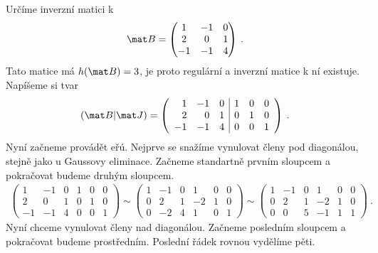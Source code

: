 \begin{example}
    Určíme inverzní matici k \begin{align}
        \mat B = \begin{pmatrix}
            1 & -1 & 0 \\
            2 & 0 & 1 \\
            -1 & -1 & 4
        \end{pmatrix} \:.
    \end{align}
    Tato matice má $h(\mat B ) = 3$, je proto regulární a inverzní matice k ní existuje.
    Napíšeme si tvar \begin{align}
        (\mat B | \mat J) = \left(\begin{array}{rrr|rrr}
            1 & -1 & 0 & 1 & 0 & 0\\
            2 & 0 & 1 & 0 & 1 & 0\\
            -1 & -1 & 4 & 0 & 0 & 1
        \end{array}\right) \:.
    \end{align}
    Nyní začneme provádět eřú. Nejprve se snažíme vynulovat členy pod diagonálou, stejně jako u Gaussovy eliminace. Začneme standartně prvním sloupcem a pokračovat budeme druhým sloupcem.
    \begin{align}
        \left(\begin{array}{rrr|rrr}
            1 & -1 & 0 & 1 & 0 & 0\\
            2 & 0 & 1 & 0 & 1 & 0\\
            -1 & -1 & 4 & 0 & 0 & 1
        \end{array}\right) 
        \sim
        \left(\begin{array}{rrr|rrr}
            1 & -1 & 0 & 1 & 0 & 0\\
            0 & 2 & 1 & -2 & 1 & 0\\
            0 & -2 & 4 & 1 & 0 & 1
        \end{array}\right)
        \sim
        \left(\begin{array}{rrr|rrr}
            1 & -1 & 0 & 1 & 0 & 0\\
            0 & 2 & 1 & -2 & 1 & 0\\
            0 & 0 & 5 & -1 & 1 & 1
        \end{array}\right) \:.
    \end{align}
    Nyní chceme vynulovat členy nad diagonálou. Začneme posledním sloupcem a pokračovat budeme prostředním. Poslední řádek rovnou vydělíme pěti.
    \begin{align}

\end{align}
\end{example}
